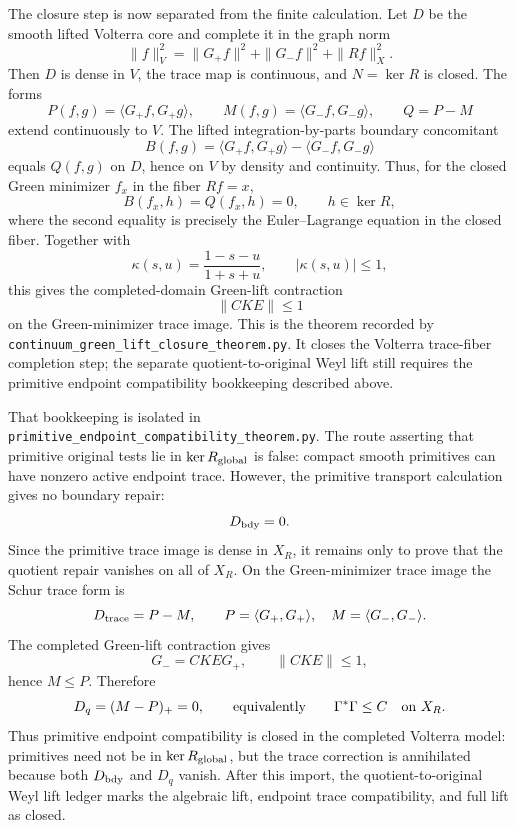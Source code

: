 \documentclass[11pt]{article}
\begin{document}
The closure step is now separated from the finite calculation.  Let \(D\) be
the smooth lifted Volterra core and complete it in the graph norm
\[
  \|f\|_V^2=\|G_+f\|^2+\|G_-f\|^2+\|Rf\|_X^2 .
\]
Then \(D\) is dense in \(V\), the trace map is continuous, and
\(N=\ker R\) is closed.  The forms
\[
  P(f,g)=\langle G_+f,G_+g\rangle,\qquad
  M(f,g)=\langle G_-f,G_-g\rangle,\qquad
  Q=P-M
\]
extend continuously to \(V\).  The lifted integration-by-parts boundary
concomitant
\[
  B(f,g)=\langle G_+f,G_+g\rangle-\langle G_-f,G_-g\rangle
\]
equals \(Q(f,g)\) on \(D\), hence on \(V\) by density and continuity.  Thus,
for the closed Green minimizer \(f_x\) in the fiber \(Rf=x\),
\[
  B(f_x,h)=Q(f_x,h)=0,\qquad h\in\ker R,
\]
where the second equality is precisely the Euler--Lagrange equation in the
closed fiber.  Together with
\[
  \kappa(s,u)=\frac{1-s-u}{1+s+u},\qquad |\kappa(s,u)|\le1,
\]
this gives the completed-domain Green-lift contraction
\[
  \|C K E\|\le1
\]
on the Green-minimizer trace image.  This is the theorem recorded by
\texttt{continuum\_green\_lift\_closure\_theorem.py}.  It closes the Volterra
trace-fiber completion step; the separate quotient-to-original Weyl lift still
requires the primitive endpoint compatibility bookkeeping described above.

That bookkeeping is isolated in
\texttt{primitive\_endpoint\_compatibility\_theorem.py}.  The route asserting
that primitive original tests lie in \(\ker R_{\rm global}\) is false:
compact smooth primitives can have nonzero active endpoint trace.  However,
the primitive transport calculation gives no boundary repair:
\[
  D_{\rm bdy}=0 .
\]
Since the primitive trace image is dense in \(X_R\), it remains only to prove
that the quotient repair vanishes on all of \(X_R\).  On the Green-minimizer
trace image the Schur trace form is
\[
  D_{\rm trace}=P-M,\qquad
  P=\langle G_+,G_+\rangle,\quad M=\langle G_-,G_-\rangle .
\]
The completed Green-lift contraction gives
\[
  G_-=C K E G_+,\qquad \|C K E\|\le1,
\]
hence \(M\le P\).  Therefore
\[
  D_q=(M-P)_+=0,
  \qquad\hbox{equivalently}\qquad
  \Gamma^\ast\Gamma\le C \quad\hbox{on }X_R .
\]
Thus primitive endpoint compatibility is closed in the completed Volterra
model: primitives need not be in \(\ker R_{\rm global}\), but the trace
correction is annihilated because both \(D_{\rm bdy}\) and \(D_q\) vanish.
After this import, the quotient-to-original Weyl lift ledger marks the
algebraic lift, endpoint trace compatibility, and full lift as closed.
\end{document}
